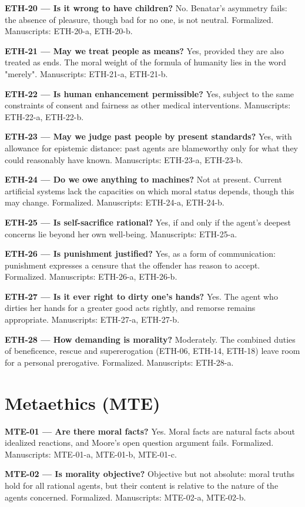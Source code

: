 \documentclass[10pt]{article}
\begin{document}
\textbf{ETH-20 --- Is it wrong to have children?} No. Benatar's asymmetry fails: the absence of pleasure, though bad for no one, is not neutral. Formalized. Manuscripts: ETH-20-a, ETH-20-b.

\textbf{ETH-21 --- May we treat people as means?} Yes, provided they are also treated as ends. The moral weight of the formula of humanity lies in the word "merely". Manuscripts: ETH-21-a, ETH-21-b.

\textbf{ETH-22 --- Is human enhancement permissible?} Yes, subject to the same constraints of consent and fairness as other medical interventions. Manuscripts: ETH-22-a, ETH-22-b.

\textbf{ETH-23 --- May we judge past people by present standards?} Yes, with allowance for epistemic distance: past agents are blameworthy only for what they could reasonably have known. Manuscripts: ETH-23-a, ETH-23-b.

\textbf{ETH-24 --- Do we owe anything to machines?} Not at present. Current artificial systems lack the capacities on which moral status depends, though this may change. Formalized. Manuscripts: ETH-24-a, ETH-24-b.

\textbf{ETH-25 --- Is self-sacrifice rational?} Yes, if and only if the agent's deepest concerns lie beyond her own well-being. Manuscripts: ETH-25-a.

\textbf{ETH-26 --- Is punishment justified?} Yes, as a form of communication: punishment expresses a censure that the offender has reason to accept. Formalized. Manuscripts: ETH-26-a, ETH-26-b.

\textbf{ETH-27 --- Is it ever right to dirty one's hands?} Yes. The agent who dirties her hands for a greater good acts rightly, and remorse remains appropriate. Manuscripts: ETH-27-a, ETH-27-b.

\textbf{ETH-28 --- How demanding is morality?} Moderately. The combined duties of beneficence, rescue and supererogation (ETH-06, ETH-14, ETH-18) leave room for a personal prerogative. Formalized. Manuscripts: ETH-28-a.

\section*{Metaethics (MTE)}
\textbf{MTE-01 --- Are there moral facts?} Yes. Moral facts are natural facts about idealized reactions, and Moore's open question argument fails. Formalized. Manuscripts: MTE-01-a, MTE-01-b, MTE-01-c.

\textbf{MTE-02 --- Is morality objective?} Objective but not absolute: moral truths hold for all rational agents, but their content is relative to the nature of the agents concerned. Formalized. Manuscripts: MTE-02-a, MTE-02-b.
\end{document}
